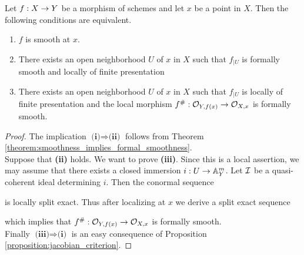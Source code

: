 \begin{corollary}\label{corollary:characterization_of_smoothness_in_terms_of_formal_smoothness_and_locally_finite_presentation}
Let $f:X\rightarrow Y$ be a morphism of schemes and let $x$ be a point in $X$. Then the following conditions are equivalent.
\begin{enumerate}[label=\emph{\textbf{(\roman*)}}, leftmargin=3.0em]
\item $f$ is smooth at $x$.
\item There exists an open neighborhood $U$ of $x$ in $X$ such that $f_{\mid U}$ is formally smooth and locally of finite presentation
\item There exists an open neighborhood $U$ of $x$ in $X$ such that $f_{\mid U}$ is locally of finite presentation and the local morphism $f^{\#}:{\mathcal O}_{Y,f(x)}\rightarrow {\mathcal O}_{X,x}$ is formally smooth.
\end{enumerate}
\end{corollary}
\begin{proof}
The implication $\textbf{(i)}\Rightarrow \textbf{(ii)}$ follows from Theorem \ref{theorem:smoothness_implies_formal_smoothness}.\\
Suppose that \textbf{(ii)} holds. We want to prove \textbf{(iii)}. Since this is a local assertion, we may assume that there exists a closed immersion $i:U\rightarrow \mathbb{A}^m_Y$. Let ${\mathcal I}$ be a quasi-coherent ideal determining $i$. Then the conormal sequence
\begin{center}
\end{center}
is locally split exact. Thus after localizing at $x$ we derive a split exact sequence
\begin{center}
\end{center}
which implies that $f^{\#}:{\mathcal O}_{Y,f(x)}\rightarrow {\mathcal O}_{X,x}$ is formally smooth.\\
Finally $\textbf{(iii)}\Rightarrow \textbf{(i)}$ is an easy consequence of Proposition \ref{proposition:jacobian_criterion}.
\end{proof}


